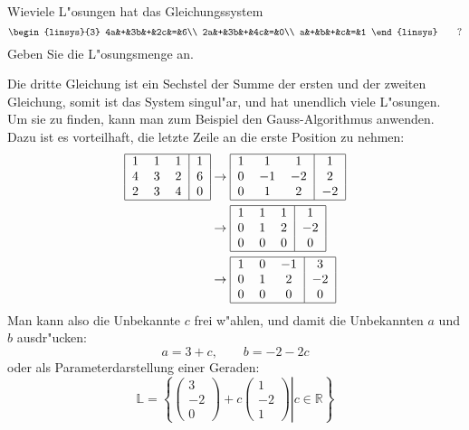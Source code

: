 Wieviele L"osungen hat das Gleichungssystem
\[
\begin{linsys}{3}
4a&+&3b&+&2c&=&6\\
2a&+&3b&+&4c&=&0\\
a&+&b&+&c&=&1
\end{linsys}
\qquad
?
\]
Geben Sie die L"osungsmenge an.

\begin{loesung}
Die dritte Gleichung ist ein Sechstel der Summe der ersten und der
zweiten Gleichung, somit ist das System singul"ar, und hat unendlich
viele L"osungen. Um sie zu finden, kann man zum Beispiel den Gauss-Algorithmus
anwenden. Dazu ist es vorteilhaft, die letzte Zeile an die erste
Position zu nehmen:
\begin{align*}
\begin{tabular}{|ccc|c|}
\hline
1&1&1&1\\
4&3&2&6\\
2&3&4&0\\
\hline
\end{tabular}
&
\rightarrow
\begin{tabular}{|ccc|c|}
\hline
1&1&1&1\\
0&$-1$&$-2$&2\\
0&1&2&$-2$\\
\hline
\end{tabular}
\\
&
\rightarrow
\begin{tabular}{|ccc|c|}
\hline
1&1&1&1\\
0&1&2&$-2$\\
0&0&0&0\\
\hline
\end{tabular}
\\
&
\rightarrow
\begin{tabular}{|ccc|c|}
\hline
1&0&$-1$&3\\
0&1&2&$-2$\\
0&0&0&0\\
\hline
\end{tabular}
\end{align*}
Man kann also die Unbekannte $c$ frei w"ahlen, und damit die Unbekannten
$a$ und $b$ ausdr"ucken:
\[
a=3+c,\qquad b=-2-2c
\]
oder als Parameterdarstellung einer Geraden:
\[
\mathbb L =\left\{\left.
\begin{pmatrix}
3\\-2\\0
\end{pmatrix}
+c\begin{pmatrix}
1\\-2\\1
\end{pmatrix}\right | c\in \mathbb R
\right\}
\]
\end{loesung}

